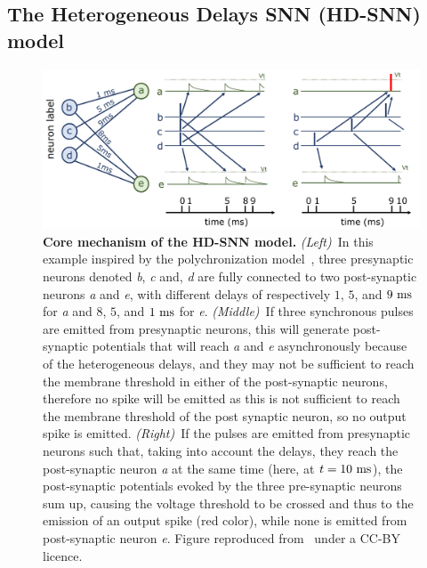 \documentclass[default]{sn-jnl}%
\theoremstyle{thmstyleone}%
\theoremstyle{thmstyletwo}%
\theoremstyle{thmstylethree}%
\begin{document}
\subsection{The Heterogeneous Delays SNN (HD-SNN) model}
%
\begin{figure}%
    \centering
    \includegraphics[width=0.980\linewidth]{figures/izhikevich.pdf}%
      \caption{\textbf{Core mechanism of the HD-SNN model.} \textit{(Left)}~In this example inspired by the polychronization model~\citep{izhikevich_polychronization_2006}, three presynaptic neurons denoted \textit{b}, \textit{c} and, \textit{d} are fully connected to two post-synaptic neurons \textit{a} and \textit{e}, with different delays of respectively $1$, $5$, and $9~\si{\milli\second}$ for \textit{a} and  $8$, $5$, and $1~\si{\milli\second}$ for \textit{e}. \textit{(Middle)}~If three synchronous pulses are emitted from presynaptic neurons, this will generate post-synaptic potentials that will reach \textit{a} and \textit{e} asynchronously because of the heterogeneous delays, and they may not be sufficient to reach the membrane threshold in either of the post-synaptic neurons, therefore no spike will be emitted as this is not sufficient to reach the membrane threshold of the post synaptic neuron, so no output spike is emitted.
      \textit{(Right)}~If the pulses are emitted from presynaptic neurons such that, taking into account the delays, they reach the post-synaptic neuron \textit{a} at the same time (here, at $t=10~\si{\milli\second}$),  the post-synaptic potentials evoked by the three pre-synaptic neurons sum up, causing the voltage threshold to be crossed and thus to the emission of an output spike (red color), while none is emitted from post-synaptic neuron \textit{e}. Figure reproduced from~\cite{grimaldi_precise_2023} under a CC-BY licence.
       }
    \label{fig:izhikevich}
  \end{figure}
\end{document}
